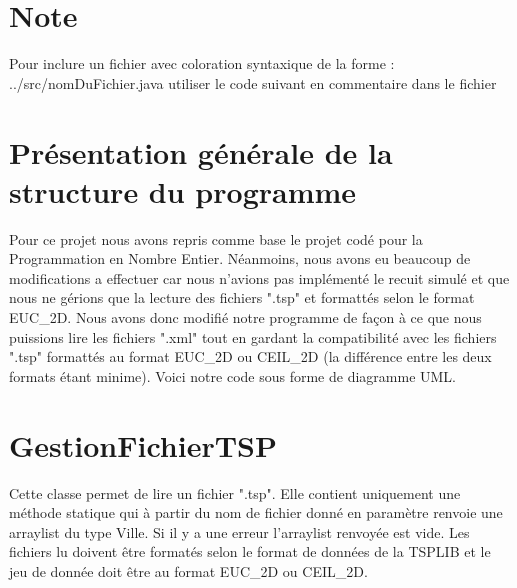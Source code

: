 \documentclass{article}
\newcommand{\code}[1]{}
\begin{document}



\section{Note}

Pour inclure un fichier avec coloration syntaxique de la forme :\newline
../src/nomDuFichier.java\newline
utiliser le code suivant en commentaire dans le fichier

\section{Présentation générale de la structure du programme}

Pour ce projet nous avons repris comme base le projet codé pour la Programmation en Nombre Entier. Néanmoins, nous avons eu beaucoup de modifications a effectuer car nous n'avions pas implémenté le recuit simulé et que nous ne gérions que la lecture des fichiers ".tsp" et formattés selon le format EUC_2D.
Nous avons donc modifié notre programme de façon à ce que nous puissions lire les fichiers ".xml" tout en gardant la compatibilité avec les fichiers ".tsp" formattés au format EUC_2D ou CEIL_2D (la différence entre les deux formats étant minime).
Voici notre code sous forme de diagramme UML.

\section{GestionFichierTSP}

Cette classe permet de lire un fichier ".tsp". Elle contient uniquement une méthode statique qui à partir du nom de fichier donné en paramètre renvoie une arraylist du type Ville. Si il y a une erreur l'arraylist renvoyée est vide.
Les fichiers lu doivent être formatés selon le format de données de la TSPLIB et le jeu de donnée doit être au format EUC_2D ou CEIL_2D.
\end{document}
